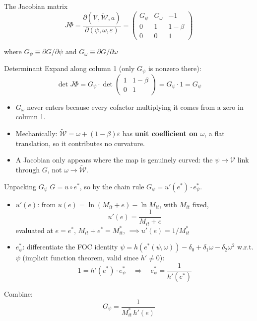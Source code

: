 \documentclass[
  ignorenonframetext,
  aspectratio=169,
]{beamer}
\providecommand{\tightlist}{%
  \setlength{\itemsep}{0pt}\setlength{\parskip}{0pt}}
\begin{document}
\begin{frame}{The Jacobian matrix}
\protect{}\label{the-jacobian-matrix}
\[
J\Phi=\frac{\partial(\mathcal V,\tilde{\mathcal W},a)}{\partial(\psi,\omega,\varepsilon)}=
\begin{pmatrix} G_\psi & G_\omega & -1\\ 0 & 1 & 1-\beta\\ 0 & 0 & 1\end{pmatrix}
\]

where \(G_\psi\equiv\partial G/\partial\psi\) and
\(G_\omega\equiv\partial G/\partial\omega\)
\end{frame}

\begin{frame}{Determinant}
\protect{}\label{determinant}
Expand along column 1 (only \(G_\psi\) is nonzero there): \[
\det J\Phi = G_\psi\cdot\det\begin{pmatrix}1 & 1-\beta\\ 0&1\end{pmatrix}=G_\psi\cdot1=G_\psi
\]

\begin{itemize}
\tightlist
\item
  \(G_\omega\) never enters because every cofactor multiplying it comes
  from a zero in column 1.
\item
  Mechanically: \(\tilde{\mathcal W}=\omega+(1-\beta)\varepsilon\) has
  \textbf{unit coefficient on \(\omega\)}, a flat translation, so it
  contributes no curvature.
\item
  A Jacobian only appears where the map is genuinely curved: the
  \(\psi\to\mathcal V\) link through \(G\), not
  \(\omega\to\tilde{\mathcal W}\).
\end{itemize}
\end{frame}

\begin{frame}{Unpacking \(G_\psi\)}
\protect{}\label{unpacking-g_psi}
\(G=u\circ e^*\), so by the chain rule \(G_\psi=u'(e^*)\cdot e^*_\psi\).

\begin{itemize}
\tightlist
\item
  \(u'(e)\): from \(u(e)=\ln(M_{it}+e)-\ln M_{it}\), with \(M_{it}\)
  fixed, \[
  u'(e)=\frac{1}{M_{it}+e}
  \] evaluated at \(e=e^*\), \(M_{it}+e^*=M^*_{it}\),
  \(\implies u'(e)=1/M^*_{it}\)
\item
  \(e^*_\psi\): differentiate the FOC identity
  \(\psi=h(e^*(\psi,\omega))-\delta_0+\delta_1\omega-\delta_2\omega^2\)
  w.r.t. \(\psi\) (implicit function theorem, valid since \(h'\neq0\)):
  \[
  1=h'(e^*)\cdot e^*_\psi \quad\Longrightarrow\quad e^*_\psi=\frac{1}{h'(e^*)}
  \]
\end{itemize}

Combine: \[
G_\psi=\frac{1}{M^*_{it}\,h'(e)}
\]
\end{frame}
\end{document}
